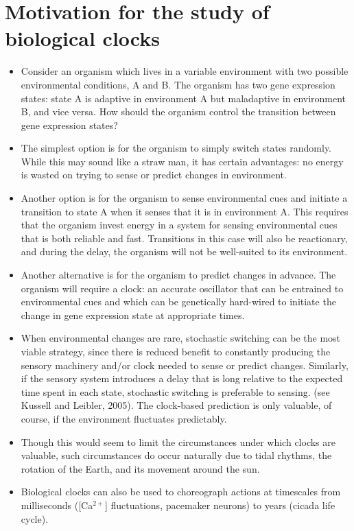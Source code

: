 \documentclass{article}
\begin{document}
\section*{Motivation for the study of biological clocks}
\begin{itemize}
\item Consider an organism which lives in a variable environment with two possible environmental conditions, A and B. The organism has two gene expression states: state A is adaptive in environment A but maladaptive in environment B, and vice versa. How should the organism control the transition between gene expression states?
\item The simplest option is for the organism to simply switch states randomly. While this may sound like a straw man, it has certain advantages: no energy is wasted on trying to sense or predict changes in environment.
\item Another option is for the organism to sense environmental cues and initiate a transition to state A when it senses that it is in environment A. This requires that the organism invest energy in a system for sensing environmental cues that is both reliable and fast. Transitions in this case will also be reactionary, and during the delay, the organism will not be well-suited to its environment.
\item Another alternative is for the organism to predict changes in advance. The organism will require a clock: an accurate oscillator that can be entrained to environmental cues and which can be genetically hard-wired to initiate the change in gene expression state at appropriate times. 
\item When environmental changes are rare, stochastic switching can be the most viable strategy, since there is reduced benefit to constantly producing the sensory machinery and/or clock needed to sense or predict changes. Similarly, if the sensory system introduces a delay that is long relative to the expected time spent in each state, stochastic switchng is preferable to sensing. (see Kussell and Leibler, 2005). The clock-based prediction is only valuable, of course, if the environment fluctuates predictably.
\item Though this would seem to limit the circumstances under which clocks are valuable, such circumstances do occur naturally due to tidal rhythms, the rotation of the Earth, and its movement around the sun.
\item Biological clocks can also be used to choreograph actions at timescales from milliseconds ([Ca$^{2+}$] fluctuations, pacemaker neurons) to years (cicada life cycle).
\end{itemize}
\end{document}
